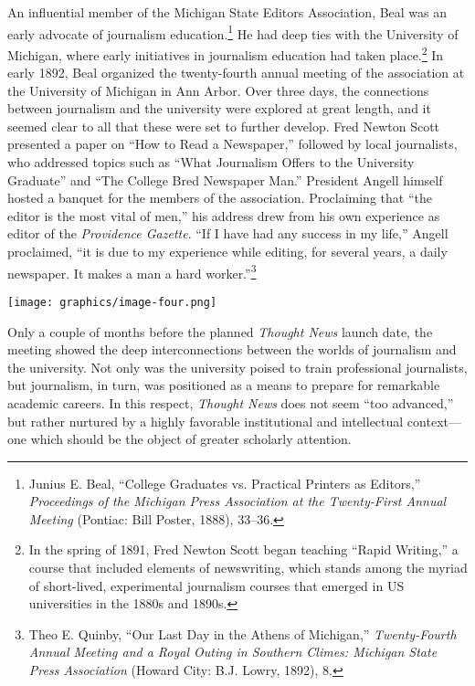 \documentclass[twoside,symmetric,nobib,justified]{tufte-book}
\begin{document}
An influential member of the Michigan State Editors Association, Beal
was an early advocate of journalism education.\footnote{Junius E. Beal,
  ``College Graduates vs. Practical Printers as Editors,''
  \emph{Proceedings of the Michigan Press Association at the
  Twenty-First Annual Meeting} (Pontiac: Bill Poster, 1888), 33--36.} He
had deep ties with the University of Michigan, where early initiatives
in journalism education had taken place.\footnote{In the spring of 1891,
  Fred Newton Scott began teaching ``Rapid Writing,'' a course that
  included elements of newswriting, which stands among the myriad of
  short-lived, experimental journalism courses that emerged in US
  universities in the 1880s and 1890s.} In early 1892, Beal organized
the twenty-fourth annual meeting of the association at the University of
Michigan in Ann Arbor. Over three days, the connections between
journalism and the university were explored at great length, and it
seemed clear to all that these were set to further develop. Fred Newton
Scott presented a paper on ``How to Read a Newspaper,'' followed by
local journalists, who addressed topics such as ``What Journalism Offers
to the University Graduate'' and ``The College Bred Newspaper Man.''
President Angell himself hosted a banquet for the members of the
association. Proclaiming that ``the editor is the most vital of men,''
his address drew from his own experience as editor of the
\emph{Providence Gazette}. ``If I have had any success in my life,''
Angell proclaimed, ``it is due to my experience while editing, for
several years, a daily newspaper. It makes a man a hard
worker.''\footnote{Theo E. Quinby, ``Our Last Day in the Athens of
  Michigan,'' \emph{Twenty-Fourth Annual Meeting and a Royal Outing in
  Southern Climes: Michigan State Press Association} (Howard City: B.J.
  Lowry, 1892), 8.}

\begin{figure*}
   \texttt{[image: graphics/image-four.png]}
   \label{fig:fig4}
\end{figure*}


Only a couple of months before the planned \emph{Thought News} launch
date, the meeting showed the deep interconnections between the worlds of
journalism and the university. Not only was the university poised to
train professional journalists, but journalism, in turn, was positioned
as a means to prepare for remarkable academic careers. In this respect,
\emph{Thought News} does not seem ``too advanced,'' but rather nurtured
by a highly favorable institutional and intellectual context---one which
should be the object of greater scholarly attention.
\end{document}
